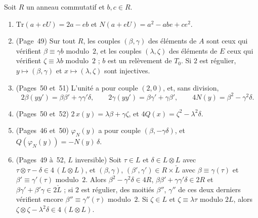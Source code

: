 \begin{encadre}
\begin{theoreme}
Soit $R$ un anneau commutatif et $b, c \in R$.
\begin{enumerate}
\item $\mathrm{Tr}(a + eU) = 2a - eb$ et $N(a + eU) = a^2 - abe + ce^2$.
\item (Page~49) Sur tout $R$, les couples $(\beta, \gamma)$ des éléments de $A$ sont ceux qui vérifient $\beta \equiv \gamma b$ modulo~$2$, et les couples $(\lambda, \zeta)$ des éléments de $E$ ceux qui vérifient $\zeta \equiv \lambda b$ modulo~$2$ ; $b$ est un relèvement de $T_0$. Si $2$ est régulier, $y \mapsto (\beta, \gamma)$ et $x \mapsto (\lambda, \zeta)$ sont injectives.
\item (Pages~50 et~51) L'unité a pour couple $(2, 0)$, et, sans division,
\[ 2\beta(yy') = \beta\beta' + \gamma\gamma'\delta, \qquad 2\gamma(yy') = \beta\gamma' + \gamma\beta', \qquad 4N(y) = \beta^2 - \gamma^2\delta. \]
\item (Pages~50 et~52) $2\,x(y) = \lambda\beta + \gamma\zeta$, et $4Q(x) = \zeta^2 - \lambda^2\delta$.
\item (Pages~46 et~50) $\varphi_N(y)$ a pour couple $(\beta, -\gamma\delta)$, et $Q(\varphi_N(y)) = -N(y)\,\delta$.
\item (Pages~49 à~52, $L$ inversible) Soit $\tau \in L$ et $\delta \in L \otimes L$ avec $\tau \otimes \tau - \delta \in 4\,(L \otimes L)$, et $(\beta, \gamma)$, $(\beta', \gamma') \in R \times \check L$ avec $\beta \equiv \gamma(\tau)$ et $\beta' \equiv \gamma'(\tau)$ modulo~$2$. Alors $\beta^2 - \gamma^2\delta \in 4R$, $\beta\beta' + \gamma\gamma'\delta \in 2R$ et $\beta\gamma' + \beta'\gamma \in 2\check L$ ; si $2$ est régulier, des moitiés $\beta''$, $\gamma''$ de ces deux derniers vérifient encore $\beta'' \equiv \gamma''(\tau)$ modulo~$2$. Si $\zeta \in L$ et $\zeta \equiv \lambda\tau$ modulo $2L$, alors $\zeta \otimes \zeta - \lambda^2\delta \in 4\,(L \otimes L)$.
\end{enumerate}
\end{theoreme}
\end{encadre}

